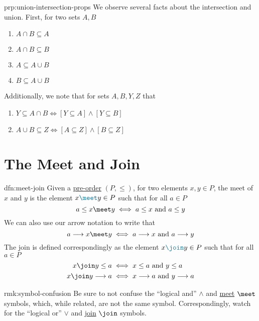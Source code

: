 \begin{prp}{prp:union-intersection-props}
    We observe several facts about the intersection and union.
    First, for two sets \( A, B \)
    \begin{enumerate}
        \item \( A \hyperref[dfn:union-intersection]{\cap} B \subseteq A \)
        \item \( A \hyperref[dfn:union-intersection]{\cap} B \subseteq B \)
        \item \( A \subseteq A \hyperref[dfn:union-intersection]{\cup} B \)
        \item \( B \subseteq A \hyperref[dfn:union-intersection]{\cup} B \)
    \end{enumerate}
    Additionally, we note that for sets \( A, B, Y, Z \) that
    \begin{enumerate}
        \item \( Y \subseteq A \hyperref[dfn:union-intersection]{\cap} B \iff [Y \subseteq A] \land [Y \subseteq B] \)
        \item \( A \hyperref[dfn:union-intersection]{\cup} B \subseteq Z \iff [A \subseteq Z] \land [B \subseteq Z] \)
    \end{enumerate}
\end{prp}

\section{The Meet and Join}\label{sec:meet-join}
\begin{dfn}{dfn:meet-join}
    Given a \hyperref[dfn:pre-order]{pre-order} \( (P, \leq) \), for two elements \( x, y \in P \), the \textcolor{dfn-color}{meet} of \( x \) and \( y \) is the element \( x \textcolor{dfn-color}{\meet} y \in P \) such that for all \( a \in P \)
    \[
        a \leq x \meet y \iff a \leq x \text{ and } a \leq y
    \]
    We can also use our arrow notation to write that
    \[
        a \longrightarrow x \meet y \iff a \longrightarrow x \text{ and } a \longrightarrow y
    \]
    The \textcolor{dfn-color}{join} is defined correspondingly as the element \( x \textcolor{dfn-color}{\join} y \in P \) such that for all \( a \in P \)
    \begin{align*}
        x \join y \leq a &\iff x \leq a \text{ and } y \leq a \\
        x \join y \longrightarrow a &\iff x \longrightarrow a \text{ and } y \longrightarrow a \\
    \end{align*}
\end{dfn}
\newpage
\begin{rmk}{rmk:symbol-confusion}
    Be sure to not confuse the ``logical and'' \( \land \) and \hyperref[dfn:meet-join]{meet} \( \meet \) symbols, which, while related, are not the same symbol.
    Correspondingly, watch for the ``logical or'' \( \lor \) and \hyperref[dfn:meet-join]{join} \( \join \) symbols.
\end{rmk}

